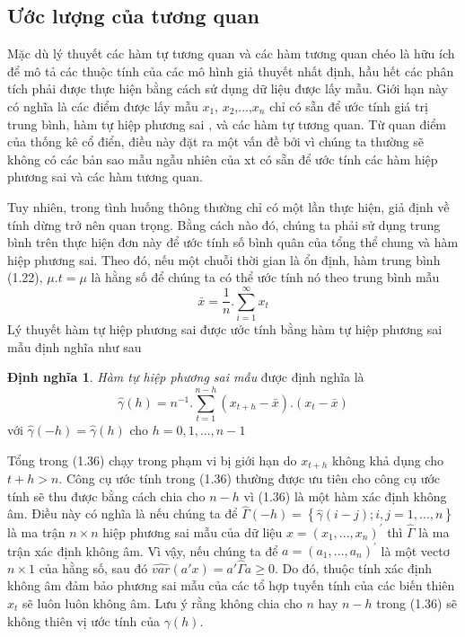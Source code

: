 \documentclass[12pt, a4paper,oneside]{book}
\theoremstyle{definition}
\newtheorem{dn}[theo]{Định nghĩa}
\begin{document}
\subsection{Ước lượng của tương quan}

Mặc dù lý thuyết các hàm tự tương quan và các hàm tương quan chéo là hữu ích để mô tả các thuộc tính của các mô hình giả thuyết nhất định, hầu hết các phân tích phải được thực hiện bằng cách sử dụng dữ liệu được lấy mẫu. Giới hạn này có nghĩa là các điểm được lấy mẫu $x_ 1$, $x_2$,...,$x_n$   chỉ có sẵn để ước tính giá trị trung bình, hàm tự hiệp phương sai  , và các hàm tự tương quan. Từ quan điểm của thống kê cổ điển, điều này đặt ra một vấn đề bởi vì chúng ta thường sẽ không có các bản sao mẫu ngẫu nhiên của xt có sẵn để ước tính các hàm hiệp phương sai và các hàm tương quan.

Tuy nhiên, trong tình huống thông thường chỉ có một lần thực hiện, giả định về tính dừng trở nên quan trọng. Bằng cách nào đó, chúng ta phải sử dụng trung bình trên thực hiện đơn này để ước tính số bình quân của tổng thể chung và hàm hiệp phương sai.
Theo đó, nếu một chuỗi thời gian là ổn định, hàm trung bình (1.22), $\mu.t=\mu$  là hằng số để chúng ta có thể ước tính nó theo trung bình mẫu
$$ \bar{x} = \frac{1}{n}.\sum _ {i = 1 } ^ { \infty } x_{t} $$
Lý thuyết hàm tự hiệp phương sai được ước tính bằng hàm tự hiệp phương sai mẫu định nghĩa như sau
\begin{dn}
\textit{Hàm tự hiệp phương sai mẫu} được định nghĩa là $$\hat{\gamma}(h) = n^{-1}.\sum _ {t = 1 } ^ {n-h} (x_{t+h}-\bar{x}).(x_{t}-\bar{x})$$	với $\hat{\gamma}(-h) = \hat{\gamma}(h)$ cho $h= 0,1,...,n-1$
\end{dn}
Tổng trong (1.36) chạy trong phạm vi bị giới hạn do $x_{t+h}$ không khả dụng cho $t + h> n$. Công cụ ước tính trong (1.36) thường được ưu tiên cho công cụ ước tính sẽ thu được bằng cách chia cho $n - h$ vì (1.36) là một hàm xác định không âm. Điều này có nghĩa là nếu chúng ta để $\hat{\Gamma}(-h) =\left\lbrace \hat{\gamma}(i-j); i,j=1,...,n\right\rbrace $ là ma trận $n \times n$  hiệp phương sai mẫu của dữ liệu $x = (x_{1}, ..., x_{n})^{'}$ thì $\hat{\Gamma}$ là ma trận xác định không âm. Vì vậy, nếu chúng ta để  $a = (a_{1}, ..., a_{n})^{'}$ là một vectơ $n \times 1$ của hằng số, sau đó $\hat{var}(a'x) = a'\hat{\varGamma}a\geq 0$. Do đó, thuộc tính xác định không âm đảm bảo phương sai mẫu của các tổ hợp tuyến tính của các biến thiên $x_{t}$ sẽ luôn luôn không âm. Lưu ý rằng không chia cho $n$ hay $n - h$ trong (1.36) sẽ không thiên vị ước tính của $\gamma(h)$.
\end{document}
